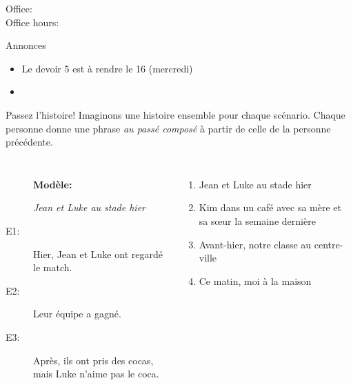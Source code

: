 \documentclass{beamer}
\subtitle[Passé composé (\lexi{avoir})]{Le passé composé avec \lexi{avoir}}
\begin{document}
  \begin{frame}
    \titlepage
    \tiny{Office: \\
          Office hours: }
  \end{frame}

  \begin{frame}{Annonces}
    \begin{itemize}
      \item Le devoir 5 est à rendre le 16 (mercredi)
      \item[] 
    \end{itemize}
  \end{frame}

  \begin{frame}{Passez l'histoire!}
    Imaginons une histoire ensemble pour chaque scénario.
    Chaque personne donne une phrase \emph{au passé composé} à partir de celle de la personne précédente. \\
    \begin{columns}
        \begin{description}
          \item[] \textbf{Modèle:}
          \item[] \emph{Jean et Luke au stade hier}
          \item[E1:] Hier, Jean et Luke ont regardé le match.
          \item[E2:] Leur équipe a gagné.
          \item[E3:] Après, ils ont pris des cocas, mais Luke n'aime pas le coca.
        \end{description}
        \begin{enumerate}
          \item Jean et Luke au stade hier
          \item Kim dans un café avec sa mère et sa sœur la semaine dernière
          \item Avant-hier, notre classe au centre-ville
          \item Ce matin, moi à la maison
        \end{enumerate}
    \end{columns}
  \end{frame}
\end{document}
